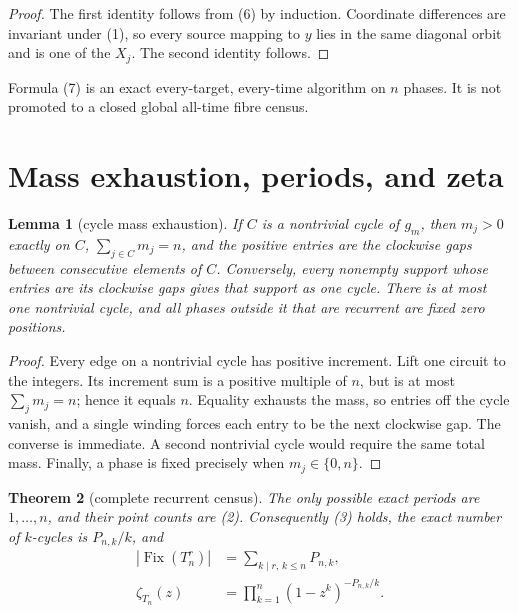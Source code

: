 \documentclass[a4paper,10pt]{amsart}
\newtheorem{theorem}{Theorem}
\newtheorem{lemma}[theorem]{Lemma}
\theoremstyle{remark}
\newcommand{\Fix}{\operatorname{Fix}}
\begin{document}
\begin{proof}
The first identity follows from (6) by induction.  Coordinate differences
are invariant under (1), so every source mapping to $y$ lies in the same
diagonal orbit and is one of the $X_j$.  The second identity follows.
\end{proof}

Formula (7) is an exact every-target, every-time algorithm on $n$ phases.
It is not promoted to a closed global all-time fibre census.

\section{Mass exhaustion, periods, and zeta}

\begin{lemma}[cycle mass exhaustion]\label{lem:cycle}
If $C$ is a nontrivial cycle of $g_m$, then $m_j>0$ exactly on $C$,
$\sum_{j\in C}m_j=n$, and the positive entries are the clockwise gaps
between consecutive elements of $C$.  Conversely, every nonempty support
whose entries are its clockwise gaps gives that support as one cycle.
There is at most one nontrivial cycle, and all phases outside it that are
recurrent are fixed zero positions.
\end{lemma}

\begin{proof}
Every edge on a nontrivial cycle has positive increment.  Lift one circuit
to the integers.  Its increment sum is a positive multiple of $n$, but is
at most $\sum_jm_j=n$; hence it equals $n$.  Equality exhausts the mass,
so entries off the cycle vanish, and a single winding forces each entry to
be the next clockwise gap.  The converse is immediate.  A second
nontrivial cycle would require the same total mass.  Finally, a phase is
fixed precisely when $m_j\in\{0,n\}$.
\end{proof}

\begin{theorem}[complete recurrent census]\label{thm:period}
The only possible exact periods are $1,\ldots,n$, and their point counts
are (2).  Consequently (3) holds, the exact number of $k$-cycles is
$P_{n,k}/k$, and
\begin{align}
 |\Fix(T_n^r)|&=\sum_{k\mid r,\,k\leq n}P_{n,k},\\
 \zeta_{T_n}(z)&=\prod_{k=1}^n(1-z^k)^{-P_{n,k}/k}.
\end{align}
\end{theorem}
\end{document}
